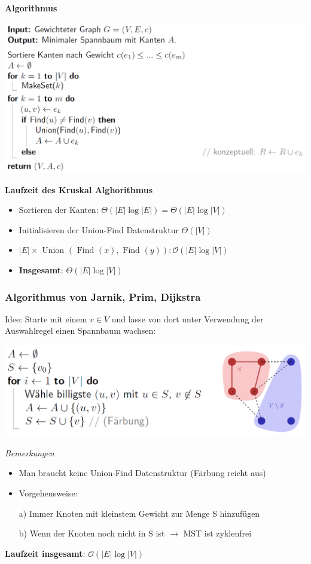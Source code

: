\begin{sectionbox}
\textbf{Algorithmus}\par
\includegraphics[width = \columnwidth]{../img/Kruskal.png}\par\smallskip

\textbf{Laufzeit des Kruskal Alghorithmus}\par
\begin{itemize}
    \item Sortieren der Kanten: $\Theta(|E| \log |E|)=\Theta(|E| \log |V|)$
    \item Initialisieren der Union-Find Datenstruktur $\Theta(|V|)$
    \item $|E| \times \text { Union }(\text { Find }(x), \text { Find }(y)): \mathcal{O}(|E| \log |V|)$
    \item \textbf{Insgesamt}: $\Theta(|E| \log |V|)$
\end{itemize}%
\end{sectionbox}

\begin{sectionbox}
\subsubsection{Algorithmus von Jarnik, Prim, Dijkstra}\smallskip
Idee: Starte mit einem $v \in V$ und lasse von dort unter Verwendung der Auswahlregel einen Spannbaum wachsen:\par
\includegraphics[width = 0.9\columnwidth]{../img/MST_JPD.png}\par\smallskip
\textit{Bemerkungen}\par
\begin{itemize}
    \item Man braucht keine Union-Find Datenstruktur (Färbung reicht aus)
    \item Vorgehensweise:
    \par \tab a) Immer Knoten mit kleinstem Gewicht zur Menge S hinzufügen
    \par \tab b) Wenn der Knoten noch nicht in S ist $\to$ MST ist zyklenfrei
\end{itemize}\par\smallskip
\textbf{Laufzeit insgesamt}: $\mathcal{O}(|E| \log |V|)$
\end{sectionbox}